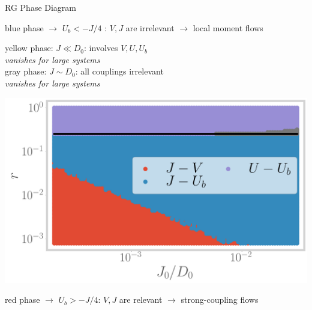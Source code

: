 \documentclass[9pt,aspectratio=169]{beamer}
\begin{document}
\begin{frame}{RG Phase Diagram}
\centering

\flushright
\begin{minipage}{0.7\textwidth}
\begin{enumerate}
\nitem blue phase \(\longrightarrow\) \(U_b < -J/4\) : \(V,J\) are \alert{irrelevant} \(\longrightarrow\) local moment flows
\end{enumerate}
\end{minipage}

\vspace*{\fill}

\begin{minipage}{0.45\textwidth}
\begin{enumerate}
\nitem yellow phase: \(J \ll D_0\): involves \alert{\(V,U,U_b\)}\\[5pt]
{\it vanishes for large systems}\\
\vspace*{40pt}
\nitem gray phase: \(J \sim D_0\): \alert{all} couplings irrelevant\\[5pt]
{\it vanishes for large systems}
\end{enumerate}
\end{minipage}
\hspace*{\fill}
\begin{minipage}{0.5\textwidth}
\includegraphics[width=\textwidth]{phase-map-MIT.png}
\end{minipage}

\vspace*{\fill}

\flushright
\begin{minipage}{0.7\textwidth}
\begin{enumerate}
\nitem red phase \(\longrightarrow\) \(U_b > -J/4\): \(V,J\) are \alert{relevant} \(\longrightarrow\) strong-coupling flows
\end{enumerate}
\end{minipage}

\end{frame}
\end{document}
